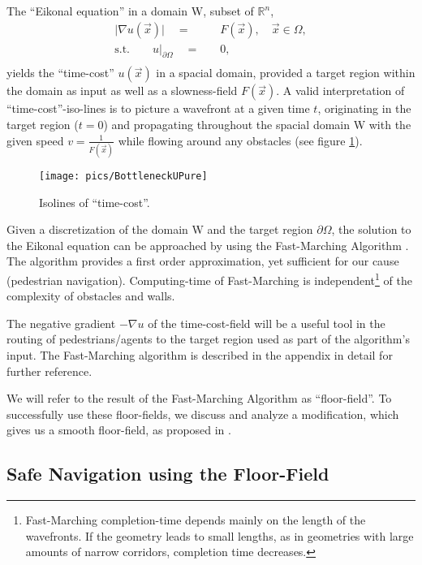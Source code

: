 The ``Eikonal equation'' in a domain \textgreek{W}, subset of $\mathbb{R}^{n}$,
\begin{align*}
\vert\nabla u(\vec{x})\vert\quad= & \quad F(\vec{x}),\quad \vec{x}\in\Omega,\\
\mathrm{s.t.}\qquad u|_{\partial\Omega}\quad= & \quad 0,\\
\end{align*}
yields the ``time-cost'' $u(\vec{x})$ in a spacial domain, provided a target region within the domain as input as well as a slowness-field $F(\vec{x})$. A valid interpretation of ``time-cost''-iso-lines is to picture a wavefront at a given time $ t $, originating in the target region ($ t=0 $) and propagating throughout the spacial domain \textgreek{W} with the given speed $v=\frac{1}{F(\vec{x})}$ while flowing around any obstacles (see figure \ref{fig:BottleneckObstaclePure}).
\begin{figure}[h!]
\texttt{[image: pics/BottleneckUPure]}
\caption{Isolines of ``time-cost''.}
\label{fig:BottleneckObstaclePure}
\end{figure}

Given a discretization of the domain \textgreek{W} and the target region ${\partial\Omega}$, the solution to the Eikonal equation can be approached by using the Fast-Marching Algorithm \citep{sethian}. The algorithm provides a first order approximation, yet sufficient for our cause (pedestrian navigation). Computing-time of Fast-Marching is independent\footnote{Fast-Marching completion-time depends mainly on the length of the wavefronts. If the geometry leads to small lengths, as in geometries with large amounts of narrow corridors, completion time decreases.} of the complexity of obstacles and walls. 

The negative gradient $-\nabla u$  of the time-cost-field will be a useful tool in the routing of pedestrians/agents to the target region used as part of the algorithm's input. The Fast-Marching algorithm is described in the appendix in detail for further reference.

We will refer to the result of the Fast-Marching Algorithm as ``floor-field''. To successfully use these floor-fields, we discuss and analyze a modification, which gives us a smooth floor-field, as proposed in \citep{Madrid}.

\subsection{Safe Navigation using the Floor-Field}

